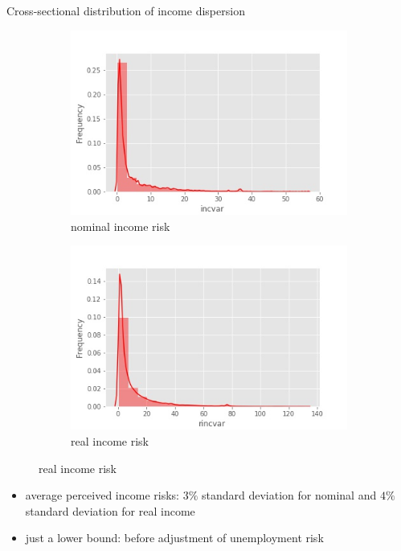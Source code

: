 \documentclass{beamer}
\begin{document}
\begin{frame}{Cross-sectional distribution of income dispersion}
	\begin{figure}
		\centering
		\label{incvar_hist}
			\begin{subfigure}[b]{0.45\textwidth}
			\centering
			\caption{nominal income risk}
		\includegraphics[width=\textwidth]{figures/hist_incvar}
		\end{subfigure}
		\begin{subfigure}[b]{0.45\textwidth}
		\centering
		\caption{real income risk}
		\includegraphics[width=\textwidth]{figures/hist_rincvar}
	\end{subfigure}
	\end{figure}
	\begin{itemize}
		\item average perceived income risks:  $3\%$ standard deviation for nominal and $4\%$ standard deviation for real income
		\item just a lower bound: before adjustment of unemployment risk 
	\end{itemize}
\end{frame}
\end{document}

